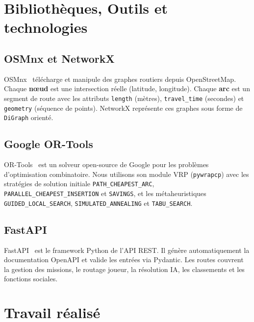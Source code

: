 \documentclass[a4paper, 12pt, twoside]{article}
\begin{document}
\section{Biblioth\`{e}ques, Outils et technologies}

\subsection{OSMnx et NetworkX}

OSMnx~\cite{osmnx} t\'{e}l\'{e}charge et manipule des graphes routiers depuis OpenStreetMap. Chaque \textbf{n\oe ud} est une intersection r\'{e}elle (latitude, longitude). Chaque \textbf{arc} est un segment de route avec les attributs \texttt{length} (m\`{e}tres), \texttt{travel\_time} (secondes) et \texttt{geometry} (s\'{e}quence de points). NetworkX repr\'{e}sente ces graphes sous forme de \texttt{DiGraph} orient\'{e}.

\subsection{Google OR-Tools}

OR-Tools~\cite{ortools} est un solveur open-source de Google pour les probl\`{e}mes d'optimisation combinatoire. Nous utilisons son module VRP (\texttt{pywrapcp}) avec les strat\'{e}gies de solution initiale \texttt{PATH\_CHEAPEST\_ARC}, \texttt{PARALLEL\_CHEAPEST\_INSERTION} et \texttt{SAVINGS}, et les m\'{e}taheuristiques \texttt{GUIDED\_LOCAL\_SEARCH}, \texttt{SIMULATED\_ANNEALING} et \texttt{TABU\_SEARCH}.

\subsection{FastAPI}

FastAPI~\cite{fastapi} est le framework Python de l'API REST. Il g\'{e}n\`{e}re automatiquement la documentation OpenAPI et valide les entr\'{e}es via Pydantic. Les routes couvrent la gestion des missions, le routage joueur, la r\'{e}solution IA, les classements et les fonctions sociales.

\section{Travail r\'{e}alis\'{e}}
\end{document}

